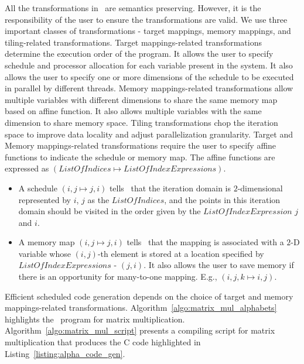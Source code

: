 All the transformations in \alphaz\ are semantics preserving. However, it is the responsibility of the user to ensure the transformations are valid. We use three important classes of transformations - target mappings, memory mappings, and tiling-related transformations. Target mappings-related transformations  determine the execution order of the program. It allows the user to specify schedule and processor allocation for each variable present in the system. It also allows the user to specify one or more dimensions of the schedule to be executed in parallel by different threads.  Memory mappings-related transformations allow multiple variables with different dimensions to share the same memory map based on affine function. It also allows multiple variables with the same dimension to share memory space. Tiling transformations chop the iteration space to improve data locality and adjust parallelization granularity. Target and Memory mappings-related transformations require the user to specify affine functions to indicate the schedule or memory map. The affine functions are expressed as $(ListOfIndices \mapsto ListOfIndexExpressions)$.
\begin{itemize}
    \item A schedule $(i, j \mapsto j, i)$ tells \alphaz\ that the iteration domain is $2$-dimensional represented by $i$, $j$ as the $ListOfIndices$, and the points in this iteration domain should be  visited in the order given by the $ListOfIndexExpression$   $j$ and $i$.
    \item A memory map $(i, j \mapsto j, i)$ tells \alphaz\ that the mapping is associated with a $2$-D variable whose $(i, j)$-th element is stored at a location specified by $ListOfIndexExpressions$ - $(j, i)$.  It also allows the user to save memory if there is an opportunity for many-to-one mapping. E.g., $(i, j, k \mapsto i, j)$.
\end{itemize}

Efficient scheduled code generation depends on the choice of target and memory mappings-related transformations. 
Algorithm~\ref{algo:matrix_mul_alphabets} highlights the \alfa\ program for matrix multiplication. Algorithm~\ref{algo:matrix_mul_script} presents a compiling script for matrix multiplication that produces the C code highlighted in Listing~\ref{listing:alpha_code_gen}.


